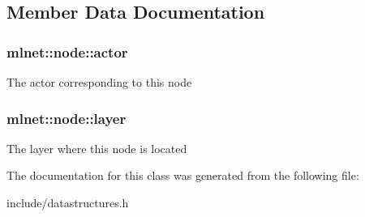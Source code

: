 \subsection{Member Data Documentation}
\hypertarget{classmlnet_1_1node_a3d003cd3e2fc96297a4e3fe5a7c8d0b1}{
\subsubsection[{actor}]{ mlnet\+::node\+::actor}}\label{classmlnet_1_1node_a3d003cd3e2fc96297a4e3fe5a7c8d0b1}
The actor corresponding to this node \hypertarget{classmlnet_1_1node_ab7c3c0f9c8c0bd4952f764aa9215217e}{
\subsubsection[{layer}]{ mlnet\+::node\+::layer}}\label{classmlnet_1_1node_ab7c3c0f9c8c0bd4952f764aa9215217e}
The layer where this node is located 

The documentation for this class was generated from the following file\+:\begin{DoxyCompactItemize}
\item 
include/datastructures.\+h\end{DoxyCompactItemize}
